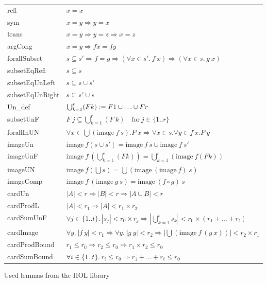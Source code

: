 \begin{figure}
\begin{center}
\begin{tabular}{l l}
refl & $x = x$ \\
sym & $x = y \Longrightarrow y = x$ \\
trans & $x = y \Longrightarrow y = z \Longrightarrow x = z$ \\
argCong & $\overline{x = y} \Longrightarrow f \overline{x} = f \overline{y}$ \\
forallSubset & $s \subseteq s' \Longrightarrow f = g \Longrightarrow (\forall x \in s'. \: f \: x) \Longrightarrow (\forall x \in s. \: g \: x)$ \\
subsetEqRefl & $s \subseteq s$ \\
subsetEqUnLeft & $s \subseteq s \cup s'$ \\
subsetEqUnRight & $s \subseteq s' \cup s$ \\
Un\_def & $\bigcup_{k=1}^r (F k) \vcentcolon= F 1 \cup \dots \cup F r$ \\
subsetUnF & $ F \: j \subseteq \bigcup_{k=1}^{r} \left( F \: k \right) \quad \text{for} \: j \in \{1..r\} $ \\
forallInUN & $ \forall x \in \bigcup \left( \text{image} \: f \: s \right). P \: x \Longrightarrow \forall x \in s. \forall y \in f \: x. P \: y $ \\
imageUn & $\text{image} \: f (s \cup s') = \text{image} \: f \: s \cup \text{image} \: f \: s'$ \\
imageUnF & $\text{image} \: f \: \left( \bigcup_{k=1}^r (F k) \right) = \bigcup_{k=1}^r (\text{image} \: f (F k))$ \\
imageUN & $\text{image} \: f \left( \bigcup s \right) = \bigcup \left( \text{image} \: (\text{image} \: f) \: s \right)$ \\
imageComp & $\text{image} \: f \: (\text{image} \: g \: s) = \text{image} \: (f \circ g) \: s$ \\
cardUn\footnotemark & $|A| < r \Longrightarrow |B| < r \Longrightarrow |A \cup B| < r$ \\
cardProdL\footnotemark[\value{footnote}] & $|A| < r_1 \Longrightarrow |A| < r_1 \times r_2$ \\
cardSumUnF\footnotemark[\value{footnote}] & $\forall j \in \{1..t\}. \: |s_j| < r_0 \times r_j \Longrightarrow \left| \bigcup_{k=1}^t s_k \right| < r_0 \times (r_1 + \dots + r_t)$ \\
cardImage\footnote[\value{footnote}] & $\forall y. \: |f \: y| < r_1 \Longrightarrow \forall y. \: |g \: y| < r_2 \Longrightarrow \left| \bigcup \left( \text{image} \: f \: (g \: x) \right) \right| < r_2 \times r_1$ \\
cardProdBound\footnote[\value{footnote}] & $r_1 \le r_0 \Longrightarrow r_2 \le r_0 \Longrightarrow r_1 \times r_2 \le r_0 $ \\
cardSumBound\footnote[\value{footnote}] & $\forall i \in \{1..t\}. \: r_i \le r_0 \Longrightarrow r_1 + \dots + r_t \le r_0$
\end{tabular}
\end{center}
\caption{Used lemmas from the \ac{HOL} library}\label{fig:lemmas}
\end{figure}

